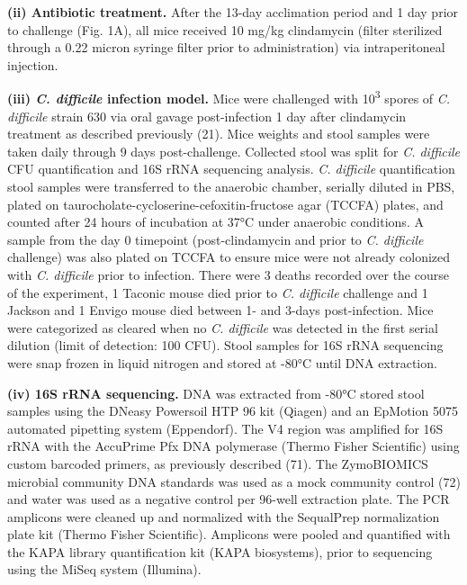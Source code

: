 \documentclass[11pt,]{article}
\begin{document}
\textbf{(ii) Antibiotic treatment.} After the 13-day acclimation period
and 1 day prior to challenge (Fig. 1A), all mice received 10 mg/kg
clindamycin (filter sterilized through a 0.22 micron syringe filter
prior to administration) via intraperitoneal injection.

\textbf{(iii) \emph{C. difficile} infection model.} Mice were challenged
with 10\textsuperscript{3} spores of \emph{C. difficile} strain 630 via
oral gavage post-infection 1 day after clindamycin treatment as
described previously (21). Mice weights and stool samples were taken
daily through 9 days post-challenge. Collected stool was split for
\emph{C. difficile} CFU quantification and 16S rRNA sequencing analysis.
\emph{C. difficile} quantification stool samples were transferred to the
anaerobic chamber, serially diluted in PBS, plated on
taurocholate-cycloserine-cefoxitin-fructose agar (TCCFA) plates, and
counted after 24 hours of incubation at 37°C under anaerobic conditions.
A sample from the day 0 timepoint (post-clindamycin and prior to
\emph{C. difficile} challenge) was also plated on TCCFA to ensure mice
were not already colonized with \emph{C. difficile} prior to infection.
There were 3 deaths recorded over the course of the experiment, 1
Taconic mouse died prior to \emph{C. difficile} challenge and 1 Jackson
and 1 Envigo mouse died between 1- and 3-days post-infection. Mice were
categorized as cleared when no \emph{C. difficile} was detected in the
first serial dilution (limit of detection: 100 CFU). Stool samples for
16S rRNA sequencing were snap frozen in liquid nitrogen and stored at
-80°C until DNA extraction.

\textbf{(iv) 16S rRNA sequencing.} DNA was extracted from -80°C stored
stool samples using the DNeasy Powersoil HTP 96 kit (Qiagen) and an
EpMotion 5075 automated pipetting system (Eppendorf). The V4 region was
amplified for 16S rRNA with the AccuPrime Pfx DNA polymerase (Thermo
Fisher Scientific) using custom barcoded primers, as previously
described (71). The ZymoBIOMICS microbial community DNA standards was
used as a mock community control (72) and water was used as a negative
control per 96-well extraction plate. The PCR amplicons were cleaned up
and normalized with the SequalPrep normalization plate kit (Thermo
Fisher Scientific). Amplicons were pooled and quantified with the KAPA
library quantification kit (KAPA biosystems), prior to sequencing using
the MiSeq system (Illumina).
\end{document}
